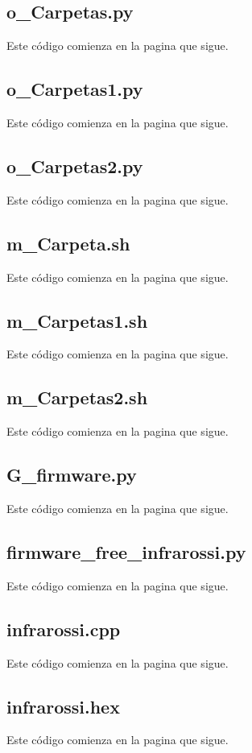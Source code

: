 \documentclass[12]{article}
\begin{document}
\subsection{o\_Carpetas.py}
Este código comienza en la pagina que sigue.

\subsection{o\_Carpetas1.py}
Este código comienza en la pagina que sigue.
 
\subsection{o\_Carpetas2.py}
Este código comienza en la pagina que sigue.
 
\subsection{m\_Carpeta.sh}
Este código comienza en la pagina que sigue.
 
\subsection{m\_Carpetas1.sh}
Este código comienza en la pagina que sigue.
 
\subsection{m\_Carpetas2.sh}
Este código comienza en la pagina que sigue.
 

\subsection{G\_firmware.py}
Este código comienza en la pagina que sigue.
  
\subsection{firmware\_free\_infrarossi.py}
Este código comienza en la pagina que sigue.
 
\subsection{infrarossi.cpp}
Este código comienza en la pagina que sigue.
 
\subsection{infrarossi.hex}
Este código comienza en la pagina que sigue.
 
\end{document}
